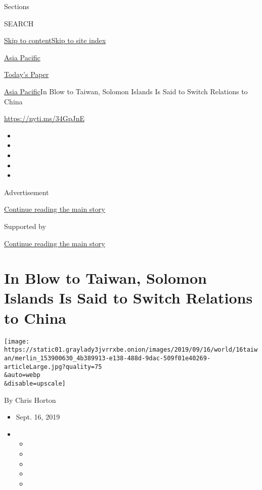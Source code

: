 Sections

SEARCH

\protect\hyperlink{site-content}{Skip to
content}\protect\hyperlink{site-index}{Skip to site index}

\href{https://www.nytimes3xbfgragh.onion/section/world/asia}{Asia
Pacific}

\href{https://myaccount.nytimes3xbfgragh.onion/auth/login?response_type=cookie\&client_id=vi}{}

\href{https://www.nytimes3xbfgragh.onion/section/todayspaper}{Today's
Paper}

\href{/section/world/asia}{Asia Pacific}\textbar{}In Blow to Taiwan,
Solomon Islands Is Said to Switch Relations to China

\url{https://nyti.ms/34GpJnE}

\begin{itemize}
\item
\item
\item
\item
\item
\end{itemize}

Advertisement

\protect\hyperlink{after-top}{Continue reading the main story}

Supported by

\protect\hyperlink{after-sponsor}{Continue reading the main story}

\hypertarget{in-blow-to-taiwan-solomon-islands-is-said-to-switch-relations-to-china}{%
\section{In Blow to Taiwan, Solomon Islands Is Said to Switch Relations
to
China}\label{in-blow-to-taiwan-solomon-islands-is-said-to-switch-relations-to-china}}

\texttt{[image: https://static01.graylady3jvrrxbe.onion/images/2019/09/16/world/16taiwan/merlin\_153900630\_4b389913-e138-488d-9dac-509f01e40269-articleLarge.jpg?quality=75\\\&auto=webp\\\&disable=upscale]}

By Chris Horton

\begin{itemize}
\item
  Sept. 16, 2019
\item
  \begin{itemize}
  \item
  \item
  \item
  \item
  \item
  \end{itemize}
\end{itemize}

